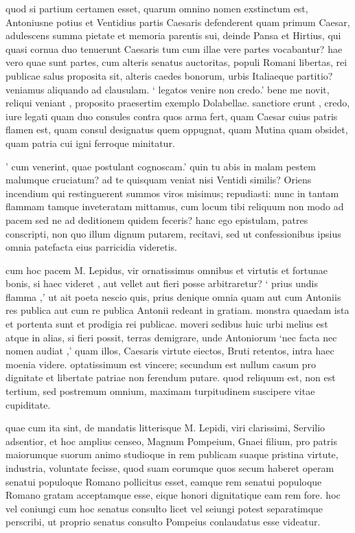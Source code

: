  quod si partium certamen esset, quarum omnino nomen exstinctum est, Antoniusne potius et Ventidius partis Caesaris defenderent quam primum Caesar, adulescens summa pietate et memoria parentis sui, deinde Pansa et Hirtius, qui quasi cornua duo tenuerunt Caesaris tum cum illae vere partes vocabantur? hae vero quae sunt partes, cum alteris senatus auctoritas, populi Romani libertas, rei publicae salus proposita sit, alteris caedes bonorum, urbis Italiaeque partitio? veniamus aliquando ad clausulam. ` legatos venire non credo.' bene me novit, reliqui veniant , proposito praesertim exemplo Dolabellae. sanctiore erunt , credo, iure legati quam duo consules contra quos arma fert, quam Caesar cuius patris flamen est, quam consul designatus quem oppugnat, quam Mutina quam obsidet, quam patria cui igni ferroque minitatur.

 ' cum venerint, quae postulant cognoscam.' quin tu abis in malam pestem malumque cruciatum? ad te quisquam veniat nisi Ventidi similis? Oriens incendium qui restinguerent summos viros misimus; repudiasti: nunc in tantam flammam tamque inveteratam mittamus, cum locum tibi reliquum non modo ad pacem sed ne ad deditionem quidem feceris? hanc ego epistulam, patres conscripti, non quo illum dignum putarem, recitavi, sed ut confessionibus ipsius omnia patefacta eius parricidia videretis.

 cum hoc pacem M. Lepidus, vir ornatissimus omnibus et virtutis et fortunae bonis, si haec videret , aut vellet aut fieri posse arbitraretur? ` prius undis flamma ,' ut ait poeta nescio quis, prius denique omnia quam aut cum Antoniis res publica aut cum re publica Antonii redeant in gratiam. monstra quaedam ista et portenta sunt et prodigia rei publicae. moveri sedibus huic urbi melius est atque in alias, si fieri possit, terras demigrare, unde Antoniorum `nec facta nec nomen audiat ,' quam illos, Caesaris virtute eiectos, Bruti retentos, intra haec moenia videre. optatissimum est vincere; secundum est nullum casum pro dignitate et libertate patriae non ferendum putare. quod reliquum est, non est tertium, sed postremum omnium, maximam turpitudinem suscipere vitae cupiditate.

 quae cum ita sint, de mandatis litterisque M. Lepidi, viri clarissimi, Servilio adsentior, et hoc amplius censeo, Magnum Pompeium, Gnaei filium, pro patris maiorumque suorum animo studioque in rem publicam suaque pristina virtute, industria, voluntate fecisse, quod suam eorumque quos secum haberet operam senatui populoque Romano pollicitus esset, eamque rem senatui populoque Romano gratam acceptamque esse, eique honori dignitatique eam rem fore. hoc vel coniungi cum hoc senatus consulto licet vel seiungi potest separatimque perscribi, ut proprio senatus consulto Pompeius conlaudatus esse videatur.
